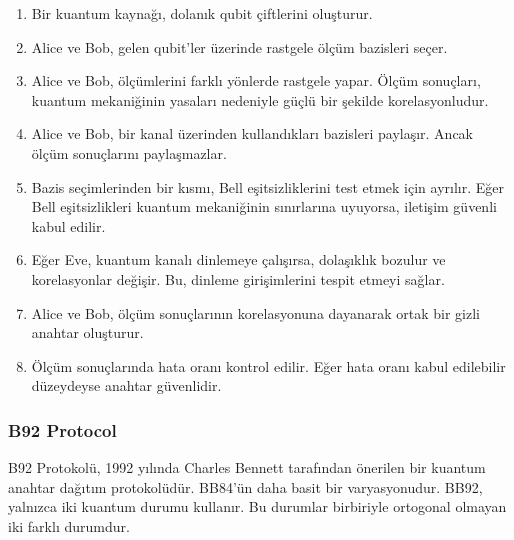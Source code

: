 \begin{enumerate}
    \item Bir kuantum kaynağı, dolanık qubit çiftlerini oluşturur.
    \item Alice ve Bob, gelen qubit'ler üzerinde rastgele ölçüm bazisleri seçer.
    \item Alice ve Bob, ölçümlerini farklı yönlerde rastgele yapar. Ölçüm sonuçları, kuantum mekaniğinin yasaları nedeniyle güçlü bir şekilde korelasyonludur.
    \item Alice ve Bob, bir kanal üzerinden kullandıkları bazisleri paylaşır. Ancak ölçüm sonuçlarını paylaşmazlar.
    \item Bazis seçimlerinden bir kısmı, Bell eşitsizliklerini test etmek için ayrılır. Eğer Bell eşitsizlikleri kuantum mekaniğinin sınırlarına uyuyorsa, iletişim güvenli kabul edilir.
    \item Eğer Eve, kuantum kanalı dinlemeye çalışırsa, dolaşıklık bozulur ve korelasyonlar değişir. Bu, dinleme girişimlerini tespit etmeyi sağlar.
    \item Alice ve Bob, ölçüm sonuçlarının korelasyonuna dayanarak ortak bir gizli anahtar oluşturur.
    \item Ölçüm sonuçlarında hata oranı kontrol edilir. Eğer hata oranı kabul edilebilir düzeydeyse anahtar güvenlidir.
\end{enumerate}

\newpage

\subsubsection{B92 Protocol}

B92 Protokolü, 1992 yılında Charles Bennett tarafından önerilen bir kuantum anahtar dağıtım protokolüdür. BB84'ün daha basit bir varyasyonudur. BB92, yalnızca iki kuantum durumu kullanır. Bu durumlar birbiriyle ortogonal olmayan iki farklı durumdur.

